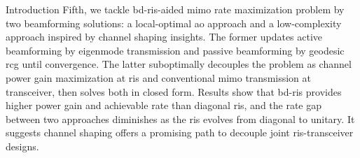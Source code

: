 \documentclass[journal]{IEEEtran}
\begin{document}
\begin{section}{Introduction}
	Fifth, we tackle \gls{bd}-\gls{ris}-aided \gls{mimo} rate maximization problem by two beamforming solutions: a local-optimal \gls{ao} approach and a low-complexity approach inspired by channel shaping insights.
	The former updates active beamforming by eigenmode transmission and passive beamforming by geodesic \gls{rcg} until convergence.
	The latter suboptimally decouples the problem as channel power gain maximization at \gls{ris} and conventional \gls{mimo} transmission at transceiver, then solves both in closed form.
	Results show that \gls{bd}-\gls{ris} provides higher power gain and achievable rate than diagonal \gls{ris}, and the rate gap between two approaches diminishes as the \gls{ris} evolves from diagonal to unitary.
	It suggests channel shaping offers a promising path to decouple joint \gls{ris}-transceiver designs.




\end{section}
\end{document}
